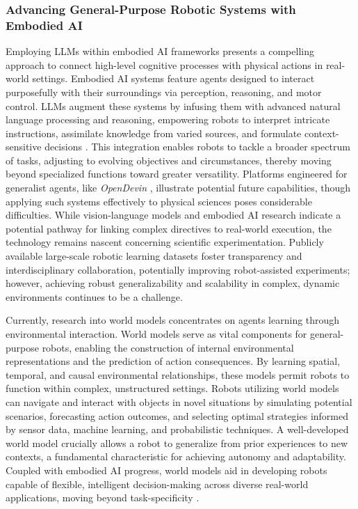 \subsubsection*{Advancing General-Purpose Robotic Systems with Embodied AI}

Employing LLMs within embodied AI frameworks presents a compelling approach to connect high-level cognitive processes with physical actions in real-world settings. Embodied AI systems feature agents designed to interact purposefully with their surroundings via perception, reasoning, and motor control. LLMs augment these systems by infusing them with advanced natural language processing and reasoning, empowering robots to interpret intricate instructions, assimilate knowledge from varied sources, and formulate context-sensitive decisions \cite{ma2024survey}. This integration enables robots to tackle a broader spectrum of tasks, adjusting to evolving objectives and circumstances, thereby moving beyond specialized functions toward greater versatility. Platforms engineered for generalist agents, like \textit{OpenDevin} \cite{wang2024opendevin, brohan2023rt}, illustrate potential future capabilities, though applying such systems effectively to physical sciences poses considerable difficulties. While vision-language models \cite{ma2024survey} and embodied AI research indicate a potential pathway for linking complex directives to real-world execution, the technology remains nascent concerning scientific experimentation. Publicly available large-scale robotic learning datasets \cite{Openxvuong2023open, padalkar2023open} foster transparency and interdisciplinary collaboration, potentially improving robot-assisted experiments; however, achieving robust generalizability and scalability in complex, dynamic environments continues to be a challenge.

Currently, research into world models concentrates on agents learning through environmental interaction. World models serve as vital components for general-purpose robots, enabling the construction of internal environmental representations and the prediction of action consequences. By learning spatial, temporal, and causal environmental relationships, these models permit robots to function within complex, unstructured settings. Robots utilizing world models can navigate and interact with objects in novel situations by simulating potential scenarios, forecasting action outcomes, and selecting optimal strategies informed by sensor data, machine learning, and probabilistic techniques. A well-developed world model crucially allows a robot to generalize from prior experiences to new contexts, a fundamental characteristic for achieving autonomy and adaptability. Coupled with embodied AI progress, world models aid in developing robots capable of flexible, intelligent decision-making across diverse real-world applications, moving beyond task-specificity  \cite{abou2024physically, wu2023daydreamer}.

